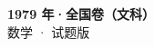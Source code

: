 \documentclass[zihao=-4, a4paper]{ctexart}
\begin{document}
\begin{center}
  {\Large\bfseries 1979 年·全国卷（文科）}\\[4pt]
  {\large 数学 · 试题版}
\end{center}
\medskip
{}

\end{document}
